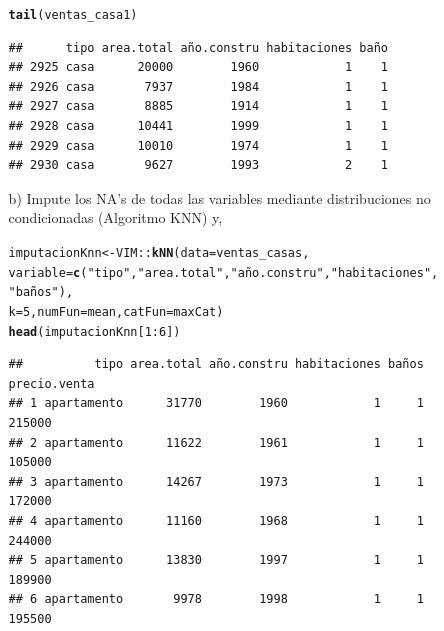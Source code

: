 \documentclass[9pt,letterpaper]{article}\usepackage[]{graphicx}\usepackage[]{color}
\makeatletter
\newcommand{\hlnum}[1]{\textcolor[rgb]{0.686,0.059,0.569}{#1}}%
\newcommand{\hlstr}[1]{\textcolor[rgb]{0.192,0.494,0.8}{#1}}%
\newcommand{\hlopt}[1]{\textcolor[rgb]{0,0,0}{#1}}%
\newcommand{\hlstd}[1]{\textcolor[rgb]{0.345,0.345,0.345}{#1}}%
\newcommand{\hlkwb}[1]{\textcolor[rgb]{0.69,0.353,0.396}{#1}}%
\newcommand{\hlkwc}[1]{\textcolor[rgb]{0.333,0.667,0.333}{#1}}%
\newcommand{\hlkwd}[1]{\textcolor[rgb]{0.737,0.353,0.396}{\textbf{#1}}}%
\newenvironment{kframe}{%
 \def\at@end@of@kframe{}%
 \ifinner\ifhmode%
  \def\at@end@of@kframe{\end{minipage}}%
  \begin{minipage}{\columnwidth}%
 \fi\fi%
 \def\FrameCommand##1{\hskip\@totalleftmargin \hskip-\fboxsep
 \colorbox{shadecolor}{##1}\hskip-\fboxsep
     \hskip-\linewidth \hskip-\@totalleftmargin \hskip\columnwidth}%
 \MakeFramed {\advance\hsize-\width
   \@totalleftmargin\z@ \linewidth\hsize
   \@setminipage}}%
 {\par\unskip\endMakeFramed%
 \at@end@of@kframe}
\newenvironment{knitrout}{}{} %
\makeatother
\begin{document}
\begin{enumerate}
\begin{enumerate}
\begin{knitrout}
\color{fgcolor}\begin{kframe}
\begin{alltt}
\hlkwd{tail}\hlstd{(ventas_casa1)}
\end{alltt}
\begin{verbatim}
##      tipo area.total año.constru habitaciones baño
## 2925 casa      20000        1960            1    1
## 2926 casa       7937        1984            1    1
## 2927 casa       8885        1914            1    1
## 2928 casa      10441        1999            1    1
## 2929 casa      10010        1974            1    1
## 2930 casa       9627        1993            2    1
\end{verbatim}
\end{kframe}
\end{knitrout}
     
      \item [b)] Impute los NA's de todas las variables mediante distribuciones no condicionadas (Algoritmo KNN) y,
\begin{knitrout}
\color{fgcolor}\begin{kframe}
\begin{alltt}
\hlstd{imputacionKnn}\hlkwb{<-}\hlstd{VIM}\hlopt{::}\hlkwd{kNN}\hlstd{(}\hlkwc{data}\hlstd{=ventas_casas,}
                        \hlkwc{variable} \hlstd{=} \hlkwd{c}\hlstd{(}\hlstr{"tipo"}\hlstd{,}\hlstr{"area.total"}\hlstd{,}\hlstr{"año.constru"}\hlstd{,}\hlstr{"habitaciones"}\hlstd{,}
                                     \hlstr{"baños"}\hlstd{),}
                        \hlkwc{k}\hlstd{=}\hlnum{5}\hlstd{,}\hlkwc{numFun}\hlstd{=mean,}\hlkwc{catFun}\hlstd{=maxCat)}
\hlkwd{head}\hlstd{(imputacionKnn[}\hlnum{1}\hlopt{:}\hlnum{6}\hlstd{])}
\end{alltt}
\begin{verbatim}
##          tipo area.total año.constru habitaciones baños precio.venta
## 1 apartamento      31770        1960            1     1       215000
## 2 apartamento      11622        1961            1     1       105000
## 3 apartamento      14267        1973            1     1       172000
## 4 apartamento      11160        1968            1     1       244000
## 5 apartamento      13830        1997            1     1       189900
## 6 apartamento       9978        1998            1     1       195500
\end{verbatim}
\end{kframe}
\end{knitrout}


\end{enumerate}
\end{enumerate}
\end{document}
